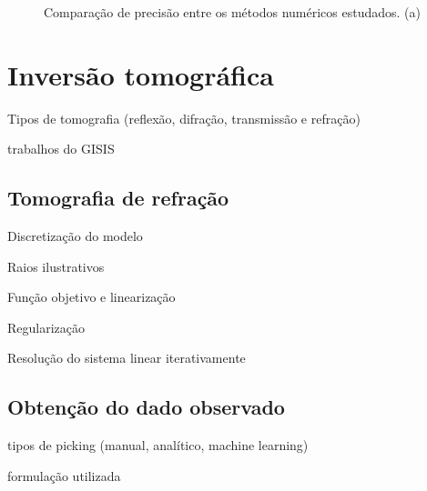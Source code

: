 \begin{figure}[H]
	\caption{Comparação de precisão entre os métodos numéricos estudados. (a)}
	\label{fig:resultsNumericalComparison}
\end{figure}







\section{Inversão tomográfica}

Tipos de tomografia (reflexão, difração, transmissão e refração)

trabalhos do GISIS

\subsection*{Tomografia de refração}
Discretização do modelo

Raios ilustrativos

Função objetivo e linearização

Regularização 

Resolução do sistema linear iterativamente

\subsection*{Obtenção do dado observado}

tipos de picking (manual, analítico, machine learning)

formulação utilizada
 
 
